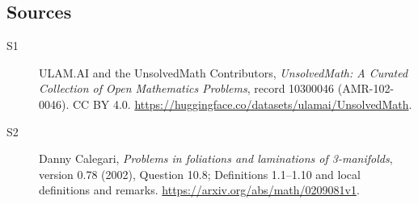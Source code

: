 \documentclass[11pt]{article}
\begin{document}
\subsection{Sources}
\begin{description}
\item[\hypertarget{source:10300046:1}{S1}] ULAM.AI and the UnsolvedMath Contributors, \emph{UnsolvedMath: A Curated Collection of Open Mathematics Problems}, record 10300046 (AMR-102-0046). CC BY 4.0. \url{https://huggingface.co/datasets/ulamai/UnsolvedMath}.
\item[\hypertarget{source:10300046:2}{S2}] Danny Calegari, \emph{Problems in foliations and laminations of 3-manifolds}, version 0.78 (2002), Question 10.8; Definitions 1.1--1.10 and local definitions and remarks. \url{https://arxiv.org/abs/math/0209081v1}.
\end{description}
\label{end:10300046}
\end{document}
